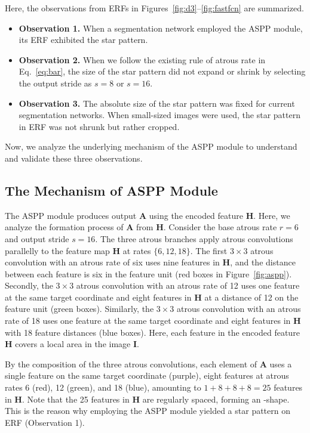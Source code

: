 \documentclass{article}
\newcommand{\bI}{\mathbf{I}}
\newcommand{\bA}{\mathbf{A}}
\newcommand{\bH}{\mathbf{H}}
\def\figref#1{Figure~\ref{#1}}
\def\eqref#1{Eq.~\ref{#1}}
\begin{document}
Here, the observations from ERFs in Figures~\ref{fig:d3}--\ref{fig:fastfcn} are summarized.
\begin{itemize}
	\item \textbf{Observation 1.} When a segmentation network employed the ASPP module, its ERF exhibited the star pattern.
	\item \textbf{Observation 2.} When we follow the existing rule of atrous rate in \eqref{eq:bar}, the size of the star pattern did not expand or shrink by selecting the output stride as $s=8$ or $s=16$.
	\item \textbf{Observation 3.} The absolute size of the star pattern was fixed for current segmentation networks. When small-sized images were used, the star pattern in ERF was not shrunk but rather cropped.
\end{itemize}

Now, we analyze the underlying mechanism of the ASPP module to understand and validate these three observations.

\subsection{The Mechanism of ASPP Module}
\label{sec:howaspp}

The ASPP module produces output $\bA$ using the encoded feature $\bH$. Here, we analyze the formation process of $\bA$ from $\bH$. Consider the base atrous rate $r=6$ and output stride $s=16$. The three atrous branches apply atrous convolutions parallelly to the feature map $\bH$ at rates $\{6, 12, 18\}$. The first $3 \times 3$ atrous convolution with an atrous rate of six uses nine features in $\bH$, and the distance between each feature is six in the feature unit (red boxes in \figref{fig:aspp}). Secondly, the $3 \times 3$ atrous convolution with an atrous rate of 12 uses one feature at the same target coordinate and eight features in $\bH$ at a distance of 12 on the feature unit (green boxes). Similarly, the $3 \times 3$ atrous convolution with an atrous rate of 18 uses one feature at the same target coordinate and eight features in $\bH$ with 18 feature distances (blue boxes). Here, each feature in the encoded feature $\bH$ covers a local area in the image $\bI$.

By the composition of the three atrous convolutions, each element of $\bA$ uses a single feature on the same target coordinate (purple), eight features at atrous rates 6 (red), 12 (green), and 18 (blue), amounting to $1+8+8+8=25$ features in $\bH$. Note that the 25 features in $\bH$ are regularly spaced, forming an \EightStarTaper-shape. This is the reason why employing the ASPP module yielded a star pattern on ERF (Observation 1).
\end{document}
